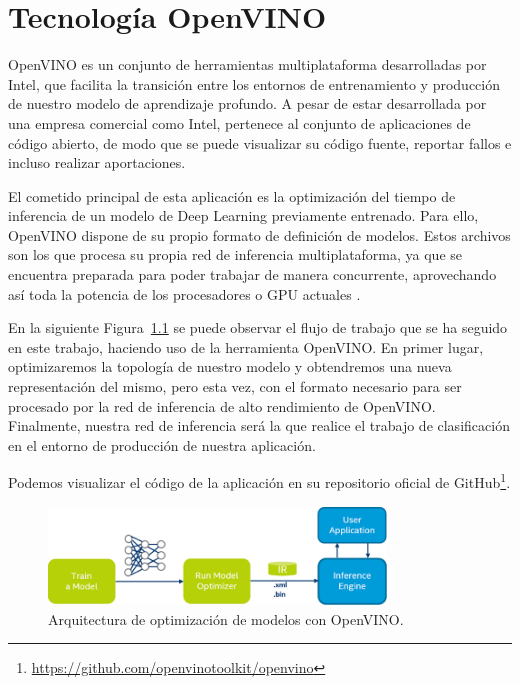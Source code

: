 \mbox{}

\lstset{
language=Python,
basicstyle=\small\sffamily,
numbers=left,
numberstyle=\tiny,
frame=tb,
columns=fullflexible,
showstringspaces=false
}

\chapter{Tecnología OpenVINO}
\label{ch:chapter3}

OpenVINO es un conjunto de herramientas multiplataforma desarrolladas por Intel, que facilita la transición entre los entornos de entrenamiento y producción de nuestro modelo de aprendizaje profundo.
A pesar de estar desarrollada por una empresa comercial como Intel, pertenece al conjunto de aplicaciones de código abierto, de modo que se puede visualizar su código fuente, reportar fallos e incluso realizar aportaciones.


El cometido principal de esta aplicación es la optimización del tiempo de inferencia de un modelo de Deep Learning previamente entrenado.
Para ello, OpenVINO dispone de su propio formato de definición de modelos.
Estos archivos son los que procesa su propia red de inferencia multiplataforma, ya que se encuentra preparada para poder trabajar de manera concurrente, aprovechando así toda la potencia de los procesadores o GPU actuales \cite{gpu_solution}.

En la siguiente Figura~\ref{fig:Arquitectura de optimización de modelos con OpenVINO} se puede observar el flujo de trabajo que se ha seguido en este trabajo, haciendo uso de la herramienta OpenVINO.
En primer lugar, optimizaremos la topología de nuestro modelo y obtendremos una nueva representación del mismo, pero esta vez, con el formato necesario para ser procesado por la red de inferencia de alto rendimiento de OpenVINO.
Finalmente, nuestra red de inferencia será la que realice el trabajo de clasificación en el entorno de producción de nuestra aplicación.

Podemos visualizar el código de la aplicación en su repositorio oficial de GitHub\footnote{\url{https://github.com/openvinotoolkit/openvino}}.


\begin{figure}
    \centering
    \includegraphics[width=0.8\textwidth]{images/chapter3/openvino_workflow.png}
    \caption{Arquitectura de optimización de modelos con OpenVINO.}
    \label{fig:Arquitectura de optimización de modelos con OpenVINO}
\end{figure}


